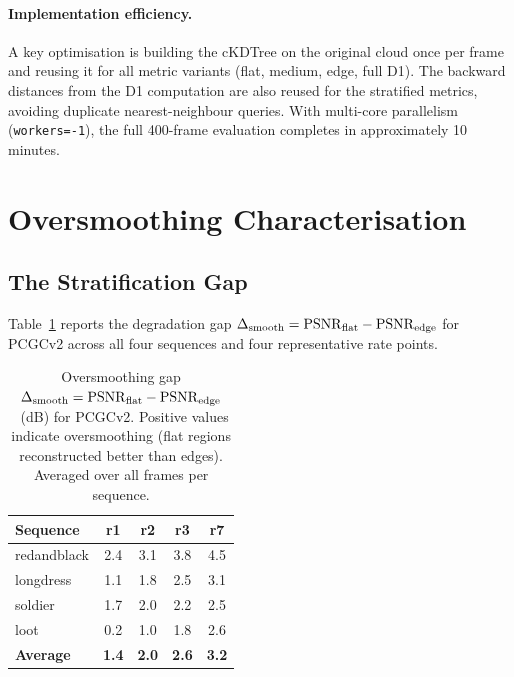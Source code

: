 \paragraph{Implementation efficiency.}
A key optimisation is building the cKDTree on the original cloud once per
frame and reusing it for all metric variants (flat, medium, edge, full D1).
The backward distances from the D1 computation are also reused for the
stratified metrics, avoiding duplicate nearest-neighbour queries.
With multi-core parallelism (\texttt{workers=-1}), the full 400-frame
evaluation completes in approximately 10 minutes.

\section{Oversmoothing Characterisation}
\label{sec:oversmoothing-char}

\subsection{The Stratification Gap}

Table~\ref{tab:degradation-gap} reports the degradation gap
$\Delta_{\text{smooth}} = \mathrm{PSNR}_{\text{flat}} - \mathrm{PSNR}_{\text{edge}}$
for PCGCv2 across all four sequences and four representative rate points.

\begin{table}[t]
  \centering
  \caption{%
    Oversmoothing gap $\Delta_{\text{smooth}} = \mathrm{PSNR}_{\text{flat}} - \mathrm{PSNR}_{\text{edge}}$~(dB)
    for PCGCv2.
    Positive values indicate oversmoothing (flat regions reconstructed better
    than edges). Averaged over all frames per sequence.
  }
  \label{tab:degradation-gap}
  \begin{tabular}{lcccc}
    \toprule
    Sequence & r1 & r2 & r3 & r7 \\
    \midrule
    redandblack & 2.4 & 3.1 & 3.8 & 4.5 \\
    longdress   & 1.1 & 1.8 & 2.5 & 3.1 \\
    soldier     & 1.7 & 2.0 & 2.2 & 2.5 \\
    loot        & 0.2 & 1.0 & 1.8 & 2.6 \\
    \midrule
    \textbf{Average} & \textbf{1.4} & \textbf{2.0} & \textbf{2.6} & \textbf{3.2} \\
    \bottomrule
  \end{tabular}
\end{table}

